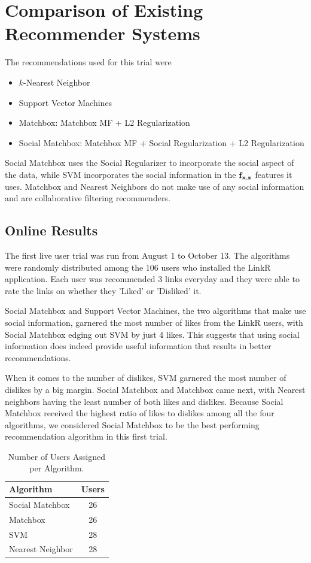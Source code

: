 \chapter{Comparison of Existing Recommender Systems}

The recommendations used for this trial were 

\begin{itemize}
\item{$k$-Nearest Neighbor}
\item{Support Vector Machines}
\item{Matchbox: Matchbox MF  + L2 Regularization}
\item{Social Matchbox: Matchbox MF + Social Regularization + L2 Regularization}
\end{itemize}

Social Matchbox uses the Social Regularizer to incorporate the social aspect of the data, while SVM incorporates the social information in the $\mathbf{f}_{\mathbf{x},\mathbf{z}}$ features it uses. Matchbox and Nearest Neighbors do not make use of any social information and are collaborative filtering recommenders.

\section{Online Results}

The first live user trial was run from August 1 to October 13. The algorithms were randomly distributed among the 106 users who installed the LinkR application. Each user was recommended 3 links everyday and they were able to rate the links on whether they 'Liked' or 'Disliked' it. 

Social Matchbox and Support Vector Machines, the two algorithms that make use social information, garnered the most number of likes from the LinkR users, with Social Matchbox edging out SVM by just 4 likes. This suggests that using social information does indeed provide useful information that results in better recommendations.

When it comes to the number of dislikes, SVM garnered the most number of dislikes by a big margin. Social Matchbox and Matchbox came next, with Nearest neighbors having the least number of both likes and dislikes. Because Social Matchbox received the highest ratio of likes to dislikes among all the four algorithms, we considered Social Matchbox to be the best performing recommendation algorithm in this first trial.

\begin{table}[h!]
\centering
\begin{tabular}{| l | c |}
\hline
{\bf Algorithm} & {\bf Users} \\
\hline
Social Matchbox & 26\\
Matchbox  & 26 \\
SVM & 28 \\
Nearest Neighbor & 28 \\
\hline
\end{tabular}
\caption{Number of Users Assigned per Algorithm.}
\end{table}


